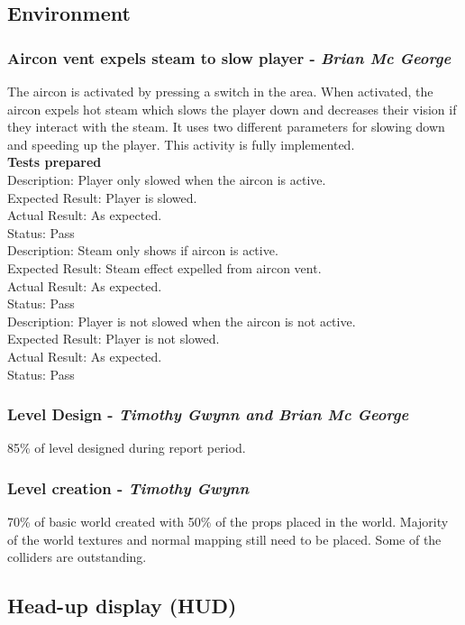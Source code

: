 \documentclass[a4paper,10pt]{article}
\begin{document}
\subsection{Environment}
\subsubsection{Aircon vent expels steam to slow player - \textit{Brian Mc George}}
The aircon is activated by pressing a switch in the area. When activated, the aircon expels hot steam which slows the player down and decreases their vision if they interact with the steam. It uses two different parameters for slowing down and speeding up the player. This activity is fully implemented.
\smallskip\\\textbf{Tests prepared}\\
Description: Player only slowed when the aircon is active.\\
Expected Result: Player is slowed.\\
Actual Result: As expected.\\
Status: Pass
\smallskip\\
Description: Steam only shows if aircon is active.\\
Expected Result: Steam effect expelled from aircon vent.\\
Actual Result: As expected.\\
Status: Pass
\smallskip\\
Description: Player is not slowed when the aircon is not active.\\
Expected Result: Player is not slowed.\\
Actual Result: As expected.\\
Status: Pass

\subsubsection{Level Design - \textit{Timothy Gwynn and Brian Mc George}}
85\% of level designed during report period.

\subsubsection{Level creation - \textit{Timothy Gwynn}}
70\% of basic world created with 50\% of the props placed in the world. Majority of the world textures and normal mapping still need to be placed. Some of the colliders are outstanding.

\subsection{Head-up display (HUD)}
\end{document}
